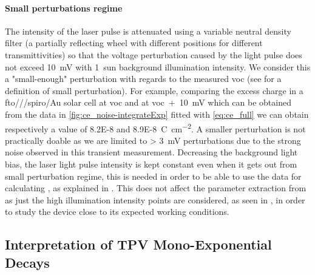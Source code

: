 \paragraph{Small perturbations regime}\label{tpv_perturbation}
The intensity of the laser pulse is attenuated using a variable neutral density filter (a partially reflecting wheel with different positions for different transmittivities) so that the voltage perturbation caused by the light pulse does not exceed \SI{10}{\mV} with 1~sun background illumination intensity.
We consider this a "small\hyp{}enough" perturbation with regards to the measured \gls{voc} (see  for a definition of small perturbation).
For example, comparing the excess charge in a \gls{fto}\-/\-/\-/\gls{spiro}\-/Au solar cell at \gls{voc} and at \gls{voc}~+~\SI{10}{\mV} which can be obtained from the data in \cref{fig:ce_noise-integrateExp} fitted with \cref{eq:ce_full} we can obtain respectively a value of \SI{8.2E-8}{} and \SI{8.9E-8}{\coulomb\per\square\cm}.
A smaller perturbation is not practically doable as we are limited to \SI{> 3}{\mV} perturbations due to the strong noise observed in this transient measurement.
Decreasing the background light bias, the laser light pulse intensity is kept constant even when it gets out from small perturbation regime, this is needed in order to be able to use the  data for calculating , as explained in .
This does not affect the parameter extraction from  as just the high illumination intensity points are considered, as seen in , in order to study the device close to its expected working conditions.

	\subsection{Interpretation of TPV Mono\hyp{}Exponential Decays}

